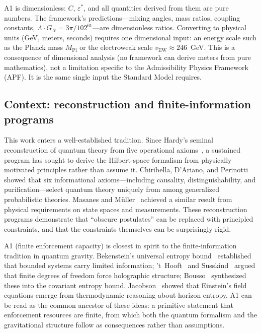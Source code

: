 \documentclass[11pt]{article}
\begin{document}
A1 is dimensionless: $C$, $\varepsilon^*$, and all quantities derived from them are pure numbers.  The framework's predictions---mixing angles, mass ratios, coupling constants, $\Lambda \cdot G_N = 3\pi/102^{61}$---are dimensionless ratios.  Converting to physical units (GeV, meters, seconds) requires one dimensional input: an energy scale such as the Planck mass $M_{\mathrm{Pl}}$ or the electroweak scale $v_{\mathrm{EW}} \approx 246$~GeV.  This is a consequence of dimensional analysis (no framework can derive meters from pure mathematics), not a limitation specific to the Admissibility Physics Framework (APF).  It is the same single input the Standard Model requires.


\subsection{Context: reconstruction and finite-information programs}

This work enters a well-established tradition.  Since Hardy's seminal reconstruction of quantum theory from five operational axioms~\cite{Hardy2001}, a sustained program has sought to derive the Hilbert-space formalism from physically motivated principles rather than assume it.  Chiribella, D'Ariano, and Perinotti~\cite{CDP2011} showed that six informational axioms---including causality, distinguishability, and purification---select quantum theory uniquely from among generalized probabilistic theories.  Masanes and M\"uller~\cite{MM2011} achieved a similar result from physical requirements on state spaces and measurements.  These reconstruction programs demonstrate that ``obscure postulates'' can be replaced with principled constraints, and that the constraints themselves can be surprisingly rigid.

A1 (finite enforcement capacity) is closest in spirit to the finite-information tradition in quantum gravity.  Bekenstein's universal entropy bound~\cite{Bekenstein1981} established that bounded systems carry limited information; 't~Hooft~\cite{tHooft1993} and Susskind~\cite{Susskind1995} argued that finite degrees of freedom force holographic structure; Bousso~\cite{Bousso2002} synthesized these into the covariant entropy bound.  Jacobson~\cite{Jacobson1995} showed that Einstein's field equations emerge from thermodynamic reasoning about horizon entropy.  A1 can be read as the common ancestor of these ideas: a primitive statement that enforcement resources are finite, from which both the quantum formalism and the gravitational structure follow as consequences rather than assumptions.
\end{document}
